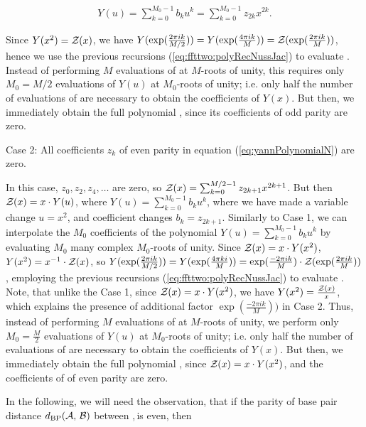 \begin{align}
Y(u) = \sum_{k=0}^{M_0-1} b_k u^k = \sum_{k=0}^{M_0-1} z_{2k} x^{2k}.
\end{align}

Since $Y(x^2)={\mathcal Z}_{}(x)$, we have
$Y(\exp(\frac{2\pi i k}{M/2})) =
Y(\exp(\frac{4\pi i k}{M})) =
{\mathcal Z}_{}(\exp(\frac{2\pi i k}{M}))$, hence we
use the previous recursions (\ref{eq:ffttwo:polyRecNussJac})
to evaluate .  Instead of
performing $M$ evaluations of \emZ{} at $M$-roots of unity,
this requires only $M_0=M/2$ evaluations of $Y(u)$ at
$M_0$-roots of unity; i.e. only half the number of
evaluations of \emZ{} are necessary to
obtain the coefficients of $Y(x)$. But then, we immediately obtain the
full polynomial \emZ{}, since its coefficients of odd parity are zero.

\medskip
{\sc Case 2}: All coefficients $z_k$ of even parity in
equation (\ref{eq:yannPolynomialN}) are zero.
\smallskip

\noindent
In this case, $z_0,z_2,z_4,\dots$ are zero, so
${\mathcal Z}_{}(x) = \sum_{k=0}^{M/2-1} z_{2k+1} x^{2k+1}$. But then
${\mathcal Z}_{}(x) = x \cdot Y(u)$, where
$Y(u)= \sum_{k=0}^{M_0-1} b_k u^k$, where we have made
a variable change $u=x^2$, and coefficient changes
$b_k = z_{2k+1}$. Similarly to Case 1,
we can interpolate the $M_0$ coefficients of the polynomial
$Y(u) = \sum_{k=0}^{M_0-1} b_k u^k$
by evaluating $M_0$ many complex $M_0$-roots
of unity.  Since ${\mathcal Z}_{}(x)=x \cdot Y(x^2)$, $Y(x^2) = x^{-1} \cdot {\mathcal Z}_{}(x)$,
so
$Y(\exp(\frac{2\pi i k}{M/2})) = Y(\exp(\frac{4\pi ki}{M})) =
\exp(\frac{-2\pi i k}{M}) \cdot
{\mathcal Z}_{}(\exp(\frac{2\pi i k}{M}))$, employing
the previous recursions (\ref{eq:ffttwo:polyRecNussJac})
to evaluate .  Note, that unlike the
Case 1, since ${\mathcal Z}_{}(x) = x \cdot Y(x^2)$, we have
$Y(x^2)=\frac{{\mathcal Z}_{}(x)}{x}$, which explains the presence of additional factor
$\exp(\frac{-2\pi i k}{M}))$ in Case 2.  Thus, instead of
performing $M$ evaluations of \emZ{} at $M$-roots of unity,
we perform only $M_0=\frac{M}{2}$ evaluations of $Y(u)$ at
$M_0$-roots of unity; i.e. only half the number of
evaluations of \emZ{} are necessary to
obtain the coefficients of $Y(x)$. But then, we immediately obtain the
full polynomial \emZ{}, since ${\mathcal Z}_{}(x) = x \cdot Y(x^2)$, and the
coefficients of \emZ{} of even parity are zero.

In the following, we will need the observation, that if the parity of
base pair distance $d_{\text{BP}}(\mathcal A,\,\mathcal B)$ between \strA,\,\strB is
even, then


